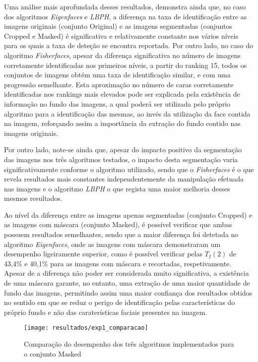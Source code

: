 Uma análise mais aprofundada desses resultados, demonstra ainda que, no caso dos algoritmos \textit{Eigenfaces} e \textit{LBPH}, a diferença na taxa de identificação entre as imagens originais (conjunto Original) e as imagens segmentadas (conjuntos Cropped e Masked) é significativa e relativamente constante nos vários níveis para os quais a taxa de deteção se encontra reportada. Por outro lado, no caso do algoritmo \textit{Fisherfaces}, apesar da diferença significativa no número de imagens corretamente identificadas nos primeiros níveis, a partir do ranking 15, todos os conjuntos de imagens obtém uma taxa de identificação similar, e com uma progressão semelhante. Esta aproximação no número de caras corretamente identificadas nos rankings mais elevados pode ser explicada pela existência de informação no fundo das imagens, a qual poderá ser utilizada pelo próprio algoritmo para a identificação das mesmas, ao invés da utilização da face contida na imagem, reforçando assim a importância da extração do fundo contido nas imagens originais.

Por outro lado, note-se ainda que, apesar do impacto positivo da segmentação das imagens nos três algoritmos testados, o impacto desta segmentação varia significativamente conforme o algoritmo utilizado, sendo que o \textit{Fisherfaces} é o que revela resultados mais constantes independentemente da manipulação efetuada nas imagens e o algoritmo \textit{LBPH} o que regista uma maior melhoria desses mesmos resultados.

Ao nível da diferença entre as imagens apenas segmentadas (conjunto Cropped) e as imagens com máscara (conjunto Masked), é possível verificar que ambas possuem resultados semelhantes, sendo que a maior diferença foi detetada no algoritmo \textit{Eigenfaces}, onde as imagens com máscara demonstraram um desempenho ligeiramente superior, como é possível verificar pelas $T_{I}(2)$ de 43,4\% e 40,1\% para as imagens com máscara e recortadas, respetivamente. Apesar de a diferença não poder ser considerada muito significativa, a existência de uma máscara garante, no entanto, uma extração de uma maior quantidade de fundo das imagens, permitindo assim uma maior confiança dos resultados obtidos no sentido em que se reduz o perigo de identificação pelas características do próprio fundo e não das caraterísticas faciais presentes na imagem. 

\begin{figure}[ht]
  \begin{center}
    \leavevmode
    \texttt{[image: resultados/exp1\_comparacao]}
    \caption{Comparação do desempenho dos três algoritmos implementados para o conjunto Masked}
    \label{fig:exp1_comaparacao}
  \end{center}
\end{figure}

